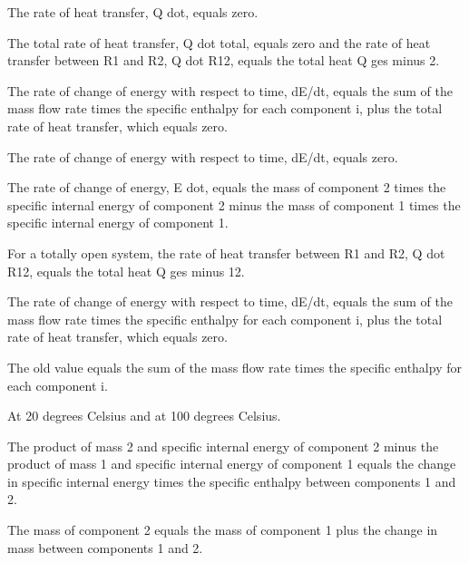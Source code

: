 The rate of heat transfer, Q dot, equals zero.

The total rate of heat transfer, Q dot total, equals zero and the rate of heat transfer between R1 and R2, Q dot R12, equals the total heat Q ges minus 2.

The rate of change of energy with respect to time, dE/dt, equals the sum of the mass flow rate times the specific enthalpy for each component i, plus the total rate of heat transfer, which equals zero.

The rate of change of energy with respect to time, dE/dt, equals zero.

The rate of change of energy, E dot, equals the mass of component 2 times the specific internal energy of component 2 minus the mass of component 1 times the specific internal energy of component 1.

For a totally open system, the rate of heat transfer between R1 and R2, Q dot R12, equals the total heat Q ges minus 12.

The rate of change of energy with respect to time, dE/dt, equals the sum of the mass flow rate times the specific enthalpy for each component i, plus the total rate of heat transfer, which equals zero.

The old value equals the sum of the mass flow rate times the specific enthalpy for each component i.

At 20 degrees Celsius and at 100 degrees Celsius.

The product of mass 2 and specific internal energy of component 2 minus the product of mass 1 and specific internal energy of component 1 equals the change in specific internal energy times the specific enthalpy between components 1 and 2.

The mass of component 2 equals the mass of component 1 plus the change in mass between components 1 and 2.